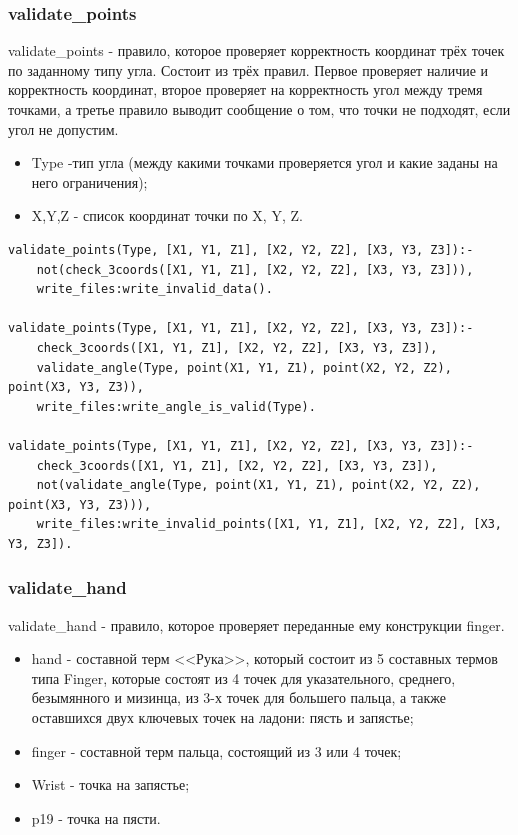 \subsubsection{validate\_points}
\hspace{0.6cm} validate\_points - правило, которое проверяет корректность координат трёх точек по заданному типу угла. Состоит из трёх правил. Первое проверяет наличие и корректность координат, второе проверяет на корректность угол между тремя точками, а третье правило выводит сообщение о том, что точки не подходят, если угол не допустим.

\begin{itemize}
	\item Type -тип угла (между какими точками проверяется угол и какие заданы на него ограничения);
	\item X,Y,Z - список координат точки по X, Y, Z.
\end{itemize}

\begin{lstlisting}[caption=Реализация правила validate\_points, label=rules:validatepoints]
validate_points(Type, [X1, Y1, Z1], [X2, Y2, Z2], [X3, Y3, Z3]):-
	not(check_3coords([X1, Y1, Z1], [X2, Y2, Z2], [X3, Y3, Z3])),
	write_files:write_invalid_data().

validate_points(Type, [X1, Y1, Z1], [X2, Y2, Z2], [X3, Y3, Z3]):-
	check_3coords([X1, Y1, Z1], [X2, Y2, Z2], [X3, Y3, Z3]),
	validate_angle(Type, point(X1, Y1, Z1), point(X2, Y2, Z2), point(X3, Y3, Z3)),
	write_files:write_angle_is_valid(Type).
	
validate_points(Type, [X1, Y1, Z1], [X2, Y2, Z2], [X3, Y3, Z3]):-
	check_3coords([X1, Y1, Z1], [X2, Y2, Z2], [X3, Y3, Z3]),
	not(validate_angle(Type, point(X1, Y1, Z1), point(X2, Y2, Z2), point(X3, Y3, Z3))),
	write_files:write_invalid_points([X1, Y1, Z1], [X2, Y2, Z2], [X3, Y3, Z3]).
\end{lstlisting}

\subsubsection{validate\_hand}
\hspace{0.6cm} validate\_hand - правило, которое проверяет переданные ему конструкции finger.

\begin{itemize}
	\item hand - составной терм <<Рука>>, который состоит из 5 составных термов типа Finger, которые состоят из 4 точек для указательного, среднего, безымянного и мизинца, из 3-х точек для большего пальца, а также оставшихся двух ключевых точек на ладони: пясть и запястье;
	\item finger - составной терм пальца, состоящий из 3 или 4 точек;
	\item Wrist - точка на запястье;
	\item p19 - точка на пясти.
\end{itemize}

